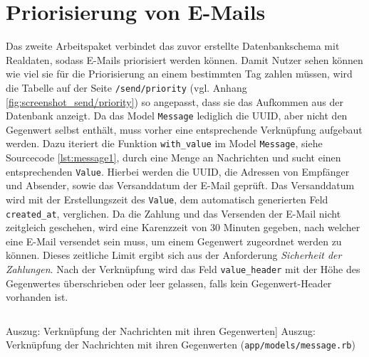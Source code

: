 \section{Priorisierung von E-Mails}
\label{Priorisierung_von_E-Mails}
Das zweite Arbeitspaket verbindet das zuvor erstellte Datenbankschema mit Realdaten, sodass E-Mails priorisiert werden können. Damit Nutzer sehen können wie viel sie für die Priorisierung an einem bestimmten Tag zahlen müssen, wird die Tabelle auf der Seite \texttt{/send/priority} (vgl. Anhang \ref{fig:screenshot_send/priority}) so angepasst, dass sie das Aufkommen aus der Datenbank anzeigt. Da das Model \texttt{Message} lediglich die UUID, aber nicht den Gegenwert selbst enthält, muss vorher eine entsprechende Verknüpfung aufgebaut werden. Dazu iteriert die Funktion \texttt{with\_value} im Model \texttt{Message}, siehe Sourcecode \ref{lst:message1}, durch eine Menge an Nachrichten und sucht einen entsprechenden \texttt{Value}. Hierbei werden die UUID, die Adressen von Empfänger und Absender, sowie das Versanddatum der E-Mail geprüft. Das Versanddatum wird mit der Erstellungszeit des \texttt{Value}, dem automatisch generierten Feld \texttt{created\_at}, verglichen. Da die Zahlung und das Versenden der E-Mail nicht zeitgleich geschehen, wird eine Karenzzeit von 30 Minuten gegeben, nach welcher eine E-Mail versendet sein muss, um einem Gegenwert zugeordnet werden zu können. Dieses zeitliche Limit ergibt sich aus der Anforderung \textit{Sicherheit der Zahlungen}. Nach der Verknüpfung wird das Feld \texttt{value\_header} mit der Höhe des Gegenwertes überschrieben oder leer gelassen, falls kein Gegenwert-Header vorhanden ist.

\begin{listing}[!ht]
\inputminted[firstline=4, lastline=20,linenos]{ruby}{Listings/Pkg2/message.rb}

\caption
    [Auszug: Verknüpfung der Nachrichten mit ihren Gegenwerten]
    {Auszug: Verknüpfung der Nachrichten mit ihren Gegenwerten (\texttt{app/models/message.rb})}

\label{lst:message1}
\end{listing}


